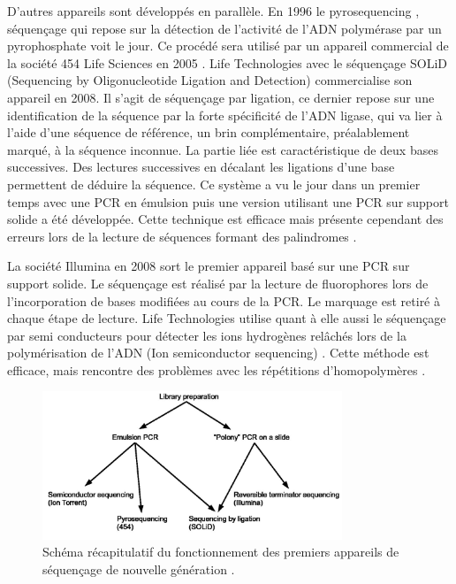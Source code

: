  D'autres appareils sont développés en parallèle. En 1996 le pyrosequencing \cite{Ronaghi1996}, séquençage qui repose sur la détection de l'activité de l'ADN polymérase par un pyrophosphate voit le jour. Ce procédé sera utilisé par un appareil commercial de la société 454 Life Sciences en 2005 \cite{Margulies2005}. Life Technologies avec le séquençage SOLiD \cite{mckernan2007reagents,Cloonan2008} (Sequencing by Oligonucleotide Ligation and Detection) commercialise son appareil en 2008. Il s'agit de séquençage par ligation, ce dernier repose sur une identification de la séquence par la forte spécificité de l'ADN ligase, qui va lier à l'aide d'une séquence de référence, un brin complémentaire, préalablement marqué, à la séquence inconnue. La partie liée est caractéristique de deux bases successives. 
 Des lectures successives en décalant les ligations d'une base permettent de déduire la séquence. Ce système a vu le jour dans un premier temps avec une PCR en émulsion puis une version utilisant une PCR sur support solide a été développée. Cette technique est efficace mais présente cependant des erreurs lors de la lecture de séquences formant des palindromes \cite{Huang2012}.
 
  La société Illumina en 2008 \cite{Bentley2008} sort le premier appareil basé sur une PCR sur support solide. Le séquençage est réalisé par la lecture de fluorophores lors de l’incorporation de bases modifiées au cours de la PCR. Le marquage est retiré à chaque étape de lecture. Life Technologies utilise quant à elle aussi le séquençage par semi conducteurs pour détecter les ions hydrogènes relâchés lors de la polymérisation de l'ADN (Ion semiconductor sequencing) \cite{Rusk2010}. Cette méthode est efficace, mais rencontre des  problèmes avec les répétitions d'homopolymères \cite{Rusk2010}. 

\begin{figure}[H]
\begin{center}
\includegraphics[width=0.8\textwidth]{ngsprinciple.jpg}
\vspace{0.5cm}

\caption[Principe du séquençage nouvelle génération]{Schéma récapitulatif du fonctionnement des premiers appareils de séquençage de nouvelle génération \cite{ngsprinciplejpg}.}
\label{ngsprinciple}
\end{center}
\end{figure}

